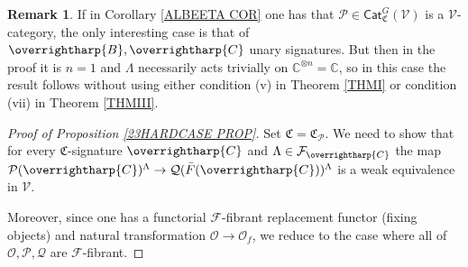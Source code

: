 \documentclass[a4paper,10pt
,draft
]{article}%
\numberwithin{equation}{section}
\numberwithin{figure}{section}
\theoremstyle{definition} %
\newtheorem{remark}[equation]{Remark}%
\newcommand{\vect}[1]{\text{\overrightharp{\ensuremath{#1}}}}
\newcommand{\F}{\ensuremath{\mathcal F}}
\newcommand{\V}{\ensuremath{\mathcal V}}
\renewcommand{\O}{\ensuremath{\mathcal O}}
\renewcommand{\P}{\ensuremath{\mathcal P}}
\newcommand{\1}{\ensuremath{\mathbbm 1}}%
\begin{document}
\begin{remark}\label{ALBEETA REM}
If in Corollary \ref{ALBEETA COR}
one has that $\P \in \mathsf{Cat}^G_{\mathfrak{C}}(\V)$
is a $\V$-category,
the only interesting case is that of
$\vect{B},\vect{C}$ unary signatures.
But then in the proof it is $n=1$ and $\Lambda$ necessarily acts trivially on
$\mathbb{C}^{\otimes n} = \mathbb{C}$,
so in this case the result follows without using either condition (v) in Theorem \ref{THMI}
or condition (vii) in Theorem \ref{THMIII}.
\end{remark}




\begin{proof}[Proof of Proposition \ref{23HARDCASE PROP}]
Set $\mathfrak{C} = \mathfrak{C}_{\P}$.
We need to show that for every 
$\mathfrak{C}$-signature $\vect{C}$ and
$\Lambda \in \F_{\vect{C}}$
the map 
$\P(\vect{C})^{\Lambda} \to \mathcal{Q}(\bar{F}(\vect{C}))^{\Lambda}$
is a weak equivalence in $\V$.

Moreover, since one has a functorial $\F$-fibrant replacement functor
(fixing objects)
and natural transformation $\O \to \O_f$,
we reduce to the case where all of $\O,\P,\mathcal{Q}$
are $\F$-fibrant.




\end{proof}
\end{document}
